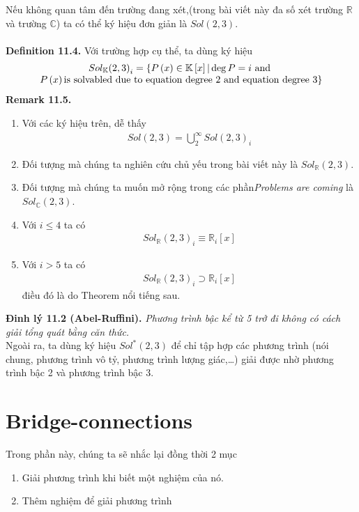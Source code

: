 \documentclass[a4paper,oneside]{book}
\numberwithin{equation}{chapter}
\begin{document}
Nếu không quan tâm đến trường đang xét,(trong bài viết này đa số xét trường $\mathbb{R}$ và trường $\mathbb{C}$) ta có thể ký hiệu đơn giản là $Sol\left( {2,3} \right)$.\\
\\
\textbf{Definition 11.4.} Với trường hợp cụ thể, ta dùng ký hiệu
\begin{align}
\begin{array}{c}
So{l_\mathbb{K}}{\left( {2,3} \right)_i} = {\rm{\{ }}P\left( x \right) \in \mathbb{K} \left[ x \right]|\deg P = i \mbox{ and }\\
P\left( x \right) \mbox{is solvabled due to equation degree 2 and equation degree 3}{\rm{\} }}
\end{array}
\end{align}
\textbf{Remark 11.5.} 
\begin{enumerate}
\item Với các ký hiệu trên, dễ thấy
\begin{align}
Sol\left( {2,3} \right) = \bigcup\limits_2^\infty  {Sol{{\left( {2,3} \right)}_i}} 
\end{align}
\item Đối tượng mà chúng ta nghiên cứu chủ yếu trong bài viết này là $So{l_\mathbb{R}}\left( {2,3} \right)$.
\item Đối tượng mà chúng ta muốn mở rộng trong các phần\textit{Problems are coming} là $So{l_\mathbb{C}}\left( {2,3} \right)$.
\item Với $i \le 4$ ta có
\begin{align}
So{l_\mathbb{R}}{\left( {2,3} \right)_i} \equiv {\mathbb{R}_i}\left[ x \right]
\end{align}
\item Với $i>5$ ta có
\begin{align}
So{l_\mathbb{R}}{\left( {2,3} \right)_i} \supset {\mathbb{R}_i}\left[ x \right]
\end{align}
điều đó là do Theorem nổi tiếng sau.
\end{enumerate}
\textbf{Đinh lý 11.2 (Abel-Ruffini).} \textit{Phương trình bậc kể từ 5 trở đi không có cách giải tổng quát bằng căn thức.}\\

Ngoài ra, ta dùng ký hiệu $So{l^*}\left( {2,3} \right)$ để chỉ tập hợp các phương trình (nói chung, phương trình vô tỷ, phương trình lượng giác,\ldots) giải được nhờ phương trình bậc 2 và phương trình bậc 3.
\section{Bridge-connections}
Trong phần này, chúng ta sẽ nhắc lại đồng thời 2 mục 
\begin{enumerate}
\item Giải phương trình khi biết một nghiệm của nó.
\item Thêm nghiệm để giải phương trình
\end{enumerate}
\end{document}
